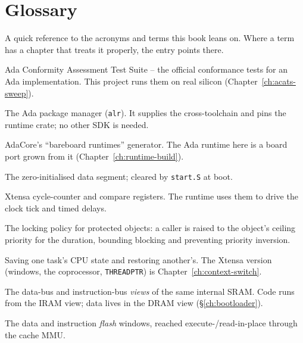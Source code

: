 \chapter{Glossary}
\label{ch:glossary}

A quick reference to the acronyms and terms this book leans on. Where a term has
a chapter that treats it properly, the entry points there.

\begin{description}[style=nextline, leftmargin=0pt]

\item[ACATS] Ada Conformity Assessment Test Suite -- the official conformance
  tests for an Ada implementation. This project runs them on real silicon
  (Chapter~\ref{ch:acats-sweep}).

\item[Alire] The Ada package manager (\texttt{alr}). It supplies the
  cross-toolchain and pins the runtime crate; no other SDK is needed.

\item[\texttt{bb-runtimes}] AdaCore's ``bareboard runtimes'' generator. The Ada
  runtime here is a board port grown from it (Chapter~\ref{ch:runtime-build}).

\item[\texttt{.bss}] The zero-initialised data segment; cleared by \texttt{start.S}
  at boot.

\item[CCOUNT / CCOMPARE] Xtensa cycle-counter and compare registers. The runtime
  uses them to drive the clock tick and timed delays.

\item[ceiling priority] The locking policy for protected objects: a caller is
  raised to the object's ceiling priority for the duration, bounding blocking and
  preventing priority inversion.

\item[context switch] Saving one task's CPU state and restoring another's. The
  Xtensa version (windows, the coprocessor, \texttt{THREADPTR}) is
  Chapter~\ref{ch:context-switch}.

\item[DRAM / IRAM] The data-bus and instruction-bus \emph{views} of the same
  internal SRAM. Code runs from the IRAM view; data lives in the DRAM view
  (\S\ref{ch:bootloader}).

\item[DROM / IROM] The data and instruction \emph{flash} windows, reached
  execute-/read-in-place through the cache MMU.


\end{description}
